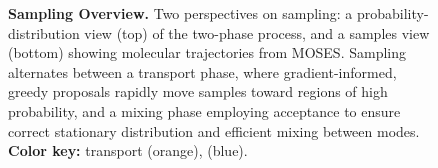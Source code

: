 \begin{figure}[h]
\vspace{-0.15cm}
\caption{\textbf{ Sampling Overview.} Two perspectives on  sampling: a probability-distribution
view (top) of the two-phase  process, and a samples view (bottom) showing molecular trajectories
from MOSES. Sampling alternates between a transport phase, where gradient-informed,
greedy proposals rapidly move samples toward regions of high probability, and a mixing phase
employing  acceptance to ensure correct stationary distribution and efficient mixing between
modes. \textbf{Color key:} transport (\textcolor{otColor}{orange}), 
(\textcolor{mhColor}{blue}).}

\label{fig:sampling-regimes}
\vspace{-5pt}
\end{figure}
